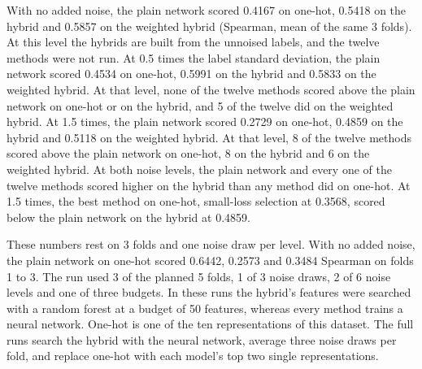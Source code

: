 With no added noise, the plain network scored 0.4167 on one-hot, 0.5418 on the hybrid and 0.5857 on the weighted hybrid (Spearman, mean of the same 3 folds). At this level the hybrids are built from the unnoised labels, and the twelve methods were not run. At 0.5 times the label standard deviation, the plain network scored 0.4534 on one-hot, 0.5991 on the hybrid and 0.5833 on the weighted hybrid. At that level, none of the twelve methods scored above the plain network on one-hot or on the hybrid, and 5 of the twelve did on the weighted hybrid. At 1.5 times, the plain network scored 0.2729 on one-hot, 0.4859 on the hybrid and 0.5118 on the weighted hybrid. At that level, 8 of the twelve methods scored above the plain network on one-hot, 8 on the hybrid and 6 on the weighted hybrid. At both noise levels, the plain network and every one of the twelve methods scored higher on the hybrid than any method did on one-hot. At 1.5 times, the best method on one-hot, small-loss selection at 0.3568, scored below the plain network on the hybrid at 0.4859.

These numbers rest on 3 folds and one noise draw per level. With no added noise, the plain network on one-hot scored 0.6442, 0.2573 and 0.3484 Spearman on folds 1 to 3. The run used 3 of the planned 5 folds, 1 of 3 noise draws, 2 of 6 noise levels and one of three budgets. In these runs the hybrid's features were searched with a random forest at a budget of 50 features, whereas every method trains a neural network. One-hot is one of the ten representations of this dataset. The full runs search the hybrid with the neural network, average three noise draws per fold, and replace one-hot with each model's top two single representations.


